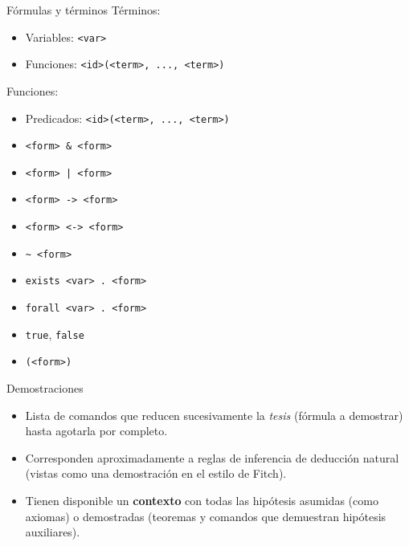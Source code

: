 \documentclass[xcolor={dvipsnames},spanish]{beamer}
\begin{document}
\begin{frame}[fragile]{Fórmulas y términos}
    Términos:
    \begin{itemize}
        \item Variables: \lstinline{<var>}
        \item Funciones: \lstinline{<id>(<term>, ..., <term>)}
    \end{itemize}

    Funciones:
    \begin{itemize}
        \item Predicados: \lstinline{<id>(<term>, ..., <term>)}
        \item \lstinline{<form> & <form>}
        \item \lstinline{<form> | <form>}
        \item \lstinline{<form> -> <form>}
        \item \lstinline{<form> <-> <form>}
        \item \lstinline{~ <form>}
        \item \lstinline{exists <var> . <form>}
        \item \lstinline{forall <var> . <form>}
        \item \lstinline{true}, \lstinline{false}
        \item \lstinline{(<form>)}
    \end{itemize}
\end{frame}

\begin{frame}{Demostraciones}
    \begin{itemize}
        \item Lista de comandos que reducen sucesivamente la \textit{tesis}
        (fórmula a demostrar) hasta agotarla por completo.
        \item Corresponden aproximadamente a reglas de inferencia de deducción
        natural (vistas como una demostración en el estilo de Fitch).
        \item Tienen disponible un \textbf{contexto} con todas las hipótesis
        asumidas (como axiomas) o demostradas (teoremas y comandos que
        demuestran hipótesis auxiliares).
    \end{itemize}
\end{frame}
\end{document}
